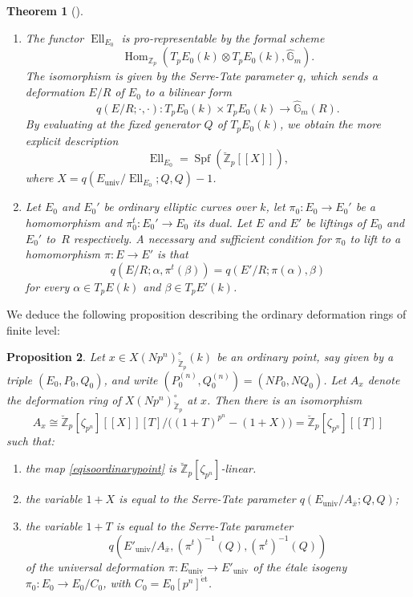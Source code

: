 \documentclass[11pt]{article}
\newcommand{\skpt}{\smallskip}
\newenvironment{enumeratei}
{\bgroup\def\theenumi{\roman{enumi}}\def\theenumii{\arabic{enumii}}\begin{enumerate}}
{\end{enumerate}\egroup}
\newcommand{\lcr}{[\![}
\newcommand{\rcr}{]\!]}
\newcommand{\et}{\mathrm{\acute{e}t}}
\newcommand{\univ}{\mathrm{univ}}
\numberwithin{equation}{section}
\newtheorem{prop}{Proposition}[section]
\newtheorem{theo}[prop]{Theorem}
\theoremstyle{definition}
\newcommand{\bb}[1]{\mathbb{#1}}
\DeclareMathOperator{\Hom}{Hom}
\DeclareMathOperator{\Spf}{Spf}
\DeclareMathOperator{\Ell}{Ell}
\newcommand{\mc}[1]{X(Np^{#1})}
\begin{document}
\skpt
\begin{theo}[{\cite[Th.\,2.1]{katz1981serre}}]
\label{SerreTate}
\begin{enumerate}

\item
The functor $\Ell_{E_0}$ is pro-representable by the formal scheme
\[\Hom_{\bb{Z}_p}(T_pE_0(k)\otimes T_p E_0(k),\widehat{\bb{G}}_m).\]
The isomorphism is given by the Serre-Tate parameter $q$, which sends a deformation $E/R$ of $E_0$ to a bilinear form
\[
q(E/R; \cdot,\cdot): T_pE_0(k)\times T_p E_0(k)\to \widehat{\bb{G}}_m(R).
\]
By evaluating at the fixed generator $Q$ of $T_p E_0(k)$, we obtain the more explicit description
\[
\Ell_{E_0}=\Spf(\breve{\bb{Z}}_p\lcr X\rcr),
\]
where $X=q(E_{\univ}/\Ell_{E_0}; Q,Q)-1$.

\item

Let $E_0$ and $E_0'$ be ordinary elliptic curves over $k$, let $\pi_0: E_0\to E_0'$ be a homomorphism and $\pi_0^t: E_0' \to E_0$ its dual. Let $E$ and $E'$ be liftings of $E_0$ and $E_0'$ to~$R$ respectively. A necessary and sufficient condition for $\pi_0$ to lift to a homomorphism $\pi:E\to E'$ is that
\[
q(E/R;\alpha, \pi^t(\beta))=q(E'/R; \pi(\alpha), \beta)
\]
for every $\alpha\in T_pE(k)$ and $\beta\in T_p E'(k)$.
\end{enumerate}
\end{theo}

We deduce the following proposition describing the ordinary deformation rings of finite level:

\begin{prop}
\label{theodefringord}
Let $x\in \mc{n}_{\breve{\bb{Z}}_p}^{\circ}(k)$ be an ordinary point, say given by a triple $(E_0,P_0,Q_0)$, and write $(P_0^{(n)},Q_0^{(n)})=(NP_0, NQ_0)$. Let $A_{x}$ denote the deformation ring of $\mc{n}_{\breve{\bb{Z}}_p}^{\circ}$ at $x$. Then there is an isomorphism
\begin{equation}
\label{eqisoordinarypoint}
A_{x}\cong \breve{\bb{Z}}_p[\zeta_{p^n}]\lcr X\rcr[T]/\bigl((1+T)^{p^n}-(1+X)\bigr)= \breve{\bb{Z}}_p[\zeta_{p^n}]\lcr T\rcr
\end{equation}
such that:

\begin{enumeratei}
\item
the map \eqref{eqisoordinarypoint} is $\breve{\bb{Z}}_p[\zeta_{p^n}]$-linear.

\item
the variable $1+X$ is equal to the Serre-Tate parameter $q(E_{\univ}/A_{\overline{x}};Q,Q)$;

\item
the variable $1+T$ is equal to the Serre-Tate parameter
\[
q(E'_{\univ}/A_{\overline{x}}, (\pi^{t})^{-1}(Q), (\pi^{t})^{-1}(Q))
\]
of the universal deformation $\pi: E_{\univ}\to E'_{\univ}$ of the étale isogeny $\pi_0: E_0\to E_0/C_0$, with $C_0=E_0[p^n]^{\et}$.
\end{enumeratei}
\end{prop}
\end{document}
